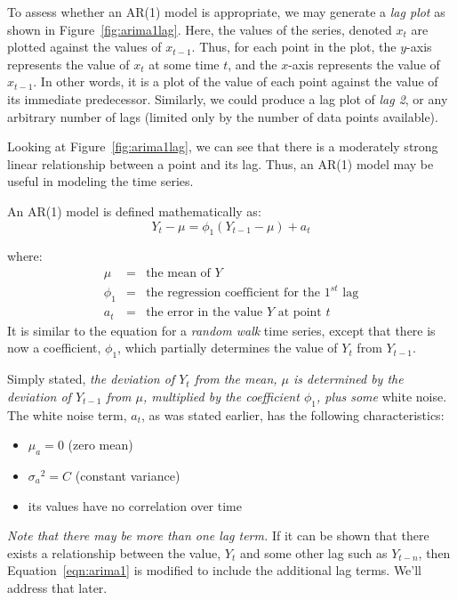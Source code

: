 \documentclass[12pt]{article}
\begin{document}
To assess whether an AR(1) model is appropriate, we may generate a \textit{lag plot} as shown in Figure~\ref{fig:arima1lag}. Here, the values of the series, denoted $x_t$ are plotted against the values of $x_{t-1}$. Thus, for each point in the plot, the $y$-axis represents the value of $x_t$ at some time $t$, and the $x$-axis represents the value of $x_{t-1}$. In other words, it is a plot of the value of each point against the value of its immediate predecessor. Similarly, we could produce a lag plot of \textit{lag 2}, or any arbitrary number of lags (limited only by the number of data points available).

Looking at Figure~\ref{fig:arima1lag}, we can see that there is a moderately strong linear relationship between a point and its lag. Thus, an AR(1) model may be useful in modeling the time series.

An AR(1) model is defined mathematically as:
\begin{equation}
Y_t - \mu = \phi_1 (Y_{t-1} - \mu) + a_t
\label{eqn:arima1}
\end{equation}

where:
\begin{eqnarray}
\mu & = & \textrm{the mean of } Y  \nonumber \\
\phi_1 & = & \textrm{the regression coefficient for the } 1^{st} \textrm{ lag} \nonumber \\
a_t & = & \textrm{the error in the value }Y \textrm{ at point } t \nonumber
\end{eqnarray}
It is similar to the equation for a \textit{random walk} time series, except that there is now a coefficient, $\phi_1$, which partially determines the value of $Y_t$ from $Y_{t-1}$.

Simply stated, \textit{the deviation of $Y_t$ from the mean, $\mu$ is determined by the deviation of $Y_{t-1}$ from $\mu$, multiplied by the coefficient $\phi_1$, plus some} white noise.
The white noise term, $a_t$, as was stated earlier, has the following characteristics:
\begin{itemize}
\item $\mu_a = 0$ (zero mean)
\item ${\sigma_a}^2 = C$ (constant variance)
\item its values have no correlation over time
\end{itemize}
\textit{Note that there may be more than one lag term.} If it can be shown that there exists a relationship between the value, $Y_t$ and some other lag such as $Y_{t-n}$, then Equation~\ref{eqn:arima1} is modified to include the additional lag terms. We'll address that later.
\end{document}
